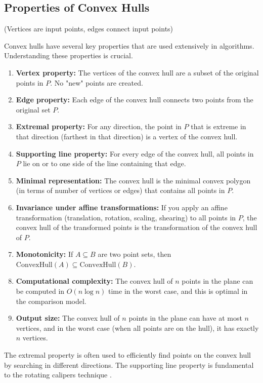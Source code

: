 \subsection{Properties of Convex Hulls}
\label{sec:convex-hull-properties}
(Vertices are input points, edges connect input points)

Convex hulls have several key properties that are used extensively in algorithms. Understanding these properties is crucial.

\begin{enumerate}
    \item \textbf{Vertex property:} The vertices of the convex hull are a subset of the original points in $P$. No "new" points are created.
    \item \textbf{Edge property:} Each edge of the convex hull connects two points from the original set $P$.
    \item \textbf{Extremal property:} For any direction, the point in $P$ that is extreme in that direction (farthest in that direction) is a vertex of the convex hull.
    \item \textbf{Supporting line property:} For every edge of the convex hull, all points in $P$ lie on or to one side of the line containing that edge.
    \item \textbf{Minimal representation:} The convex hull is the minimal convex polygon (in terms of number of vertices or edges) that contains all points in $P$.
    \item \textbf{Invariance under affine transformations:} If you apply an affine transformation (translation, rotation, scaling, shearing) to all points in $P$, the convex hull of the transformed points is the transformation of the convex hull of $P$.
    \item \textbf{Monotonicity:} If $A \subseteq B$ are two point sets, then $\text{ConvexHull}(A) \subseteq \text{ConvexHull}(B)$.
    \item \textbf{Computational complexity:} The convex hull of $n$ points in the plane can be computed in $O(n \log n)$ time in the worst case, and this is optimal in the comparison model.
    \item \textbf{Output size:} The convex hull of $n$ points in the plane can have at most $n$ vertices, and in the worst case (when all points are on the hull), it has exactly $n$ vertices.
\end{enumerate}

\begin{insight}
The extremal property is often used to efficiently find points on the convex hull by searching in different directions. The supporting line property is fundamental to the rotating calipers technique .
\end{insight}

